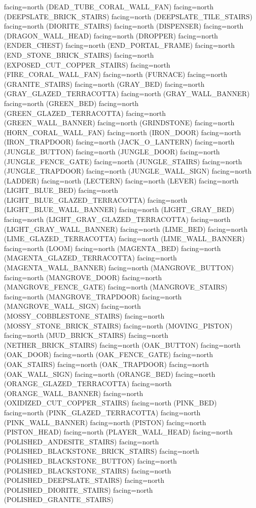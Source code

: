 \documentclass[11pt]{article}
\begin{document}
facing=north (DEAD_TUBE_CORAL_WALL_FAN)
facing=north (DEEPSLATE_BRICK_STAIRS)
facing=north (DEEPSLATE_TILE_STAIRS)
facing=north (DIORITE_STAIRS)
facing=north (DISPENSER)
facing=north (DRAGON_WALL_HEAD)
facing=north (DROPPER)
facing=north (ENDER_CHEST)
facing=north (END_PORTAL_FRAME)
facing=north (END_STONE_BRICK_STAIRS)
facing=north (EXPOSED_CUT_COPPER_STAIRS)
facing=north (FIRE_CORAL_WALL_FAN)
facing=north (FURNACE)
facing=north (GRANITE_STAIRS)
facing=north (GRAY_BED)
facing=north (GRAY_GLAZED_TERRACOTTA)
facing=north (GRAY_WALL_BANNER)
facing=north (GREEN_BED)
facing=north (GREEN_GLAZED_TERRACOTTA)
facing=north (GREEN_WALL_BANNER)
facing=north (GRINDSTONE)
facing=north (HORN_CORAL_WALL_FAN)
facing=north (IRON_DOOR)
facing=north (IRON_TRAPDOOR)
facing=north (JACK_O_LANTERN)
facing=north (JUNGLE_BUTTON)
facing=north (JUNGLE_DOOR)
facing=north (JUNGLE_FENCE_GATE)
facing=north (JUNGLE_STAIRS)
facing=north (JUNGLE_TRAPDOOR)
facing=north (JUNGLE_WALL_SIGN)
facing=north (LADDER)
facing=north (LECTERN)
facing=north (LEVER)
facing=north (LIGHT_BLUE_BED)
facing=north (LIGHT_BLUE_GLAZED_TERRACOTTA)
facing=north (LIGHT_BLUE_WALL_BANNER)
facing=north (LIGHT_GRAY_BED)
facing=north (LIGHT_GRAY_GLAZED_TERRACOTTA)
facing=north (LIGHT_GRAY_WALL_BANNER)
facing=north (LIME_BED)
facing=north (LIME_GLAZED_TERRACOTTA)
facing=north (LIME_WALL_BANNER)
facing=north (LOOM)
facing=north (MAGENTA_BED)
facing=north (MAGENTA_GLAZED_TERRACOTTA)
facing=north (MAGENTA_WALL_BANNER)
facing=north (MANGROVE_BUTTON)
facing=north (MANGROVE_DOOR)
facing=north (MANGROVE_FENCE_GATE)
facing=north (MANGROVE_STAIRS)
facing=north (MANGROVE_TRAPDOOR)
facing=north (MANGROVE_WALL_SIGN)
facing=north (MOSSY_COBBLESTONE_STAIRS)
facing=north (MOSSY_STONE_BRICK_STAIRS)
facing=north (MOVING_PISTON)
facing=north (MUD_BRICK_STAIRS)
facing=north (NETHER_BRICK_STAIRS)
facing=north (OAK_BUTTON)
facing=north (OAK_DOOR)
facing=north (OAK_FENCE_GATE)
facing=north (OAK_STAIRS)
facing=north (OAK_TRAPDOOR)
facing=north (OAK_WALL_SIGN)
facing=north (ORANGE_BED)
facing=north (ORANGE_GLAZED_TERRACOTTA)
facing=north (ORANGE_WALL_BANNER)
facing=north (OXIDIZED_CUT_COPPER_STAIRS)
facing=north (PINK_BED)
facing=north (PINK_GLAZED_TERRACOTTA)
facing=north (PINK_WALL_BANNER)
facing=north (PISTON)
facing=north (PISTON_HEAD)
facing=north (PLAYER_WALL_HEAD)
facing=north (POLISHED_ANDESITE_STAIRS)
facing=north (POLISHED_BLACKSTONE_BRICK_STAIRS)
facing=north (POLISHED_BLACKSTONE_BUTTON)
facing=north (POLISHED_BLACKSTONE_STAIRS)
facing=north (POLISHED_DEEPSLATE_STAIRS)
facing=north (POLISHED_DIORITE_STAIRS)
facing=north (POLISHED_GRANITE_STAIRS)
\end{document}
